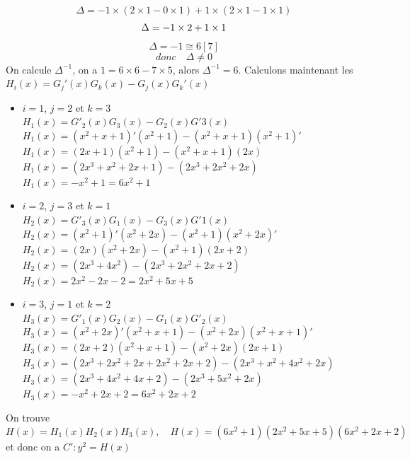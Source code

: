 \documentclass[12pt,a4paper]{article}
\begin{document}
	\[
		\Delta = -1 \times (2 \times 1 - 0 \times 1) + 1 \times (2 \times 1 - 1 \times 1)
	\]
	\[
		\Delta = -1 \times 2 + 1 \times 1\\
	\]
	\[
		\Delta = -1 \cong 6[7]
	\]
	\[
		donc \quad \Delta \neq 0
	\]
	On calcule $\Delta^{-1}$, on a $1 = 6 \times 6 - 7 \times 5$, alors $\Delta^{-1} = 6$. 
	Calculons maintenant les $H_i(x) = G_j'(x)G_k(x) - G_j(x)G_k'(x)$ \\
	\begin{itemize}
		\item $i = 1$, $j = 2$ et $k = 3$\\
			$H_1(x) = G'_2(x)G_3(x) - G_2(x)G'3(x)$\\
			$H_1(x) = (x^2 + x + 1)'(x^2 + 1) - (x^2 + x + 1)(x^2 + 1)'$\\
			$H_1(x) = (2x + 1)(x^2 + 1) - (x^2 + x + 1)(2x)$\\
			$H_1(x) = (2x^3 + x^2 + 2x + 1) - (2x^3 + 2x^2 + 2x)$\\
			$H_1(x) = -x^2 + 1 = 6 x^2 + 1$\\
		\item $i = 2$, $j = 3$ et $k = 1$\\
			$H_2(x) = G'_3(x)G_1(x) - G_3(x)G'1(x)$\\
			$H_2(x) = (x^2 + 1)'(x^2 + 2x) - (x^2 + 1)(x^2 + 2x)'$\\
			$H_2(x) = (2x)(x^2 + 2x) - (x^2 + 1)(2x + 2)$ \\
			$H_2(x) = (2x^3 + 4x^2) - (2x^3 + 2x^2 + 2x + 2)$ \\
			$H_2(x) = 2x^2 - 2x - 2 = 2x^2 + 5x + 5$\\
		\item $i = 3$, $j = 1$ et $k = 2$\\
			$H_3(x) = G'_1(x)G_2(x) - G_1(x)G'_2(x)$ \\
			$H_3(x) = (x^2 + 2x)'(x^2 + x + 1) - (x^2 + 2x)(x^2 + x + 1)'$ \\
			$H_3(x) = (2x + 2)(x^2 + x + 1) - (x^2 + 2x)(2x + 1)$ \\
			$H_3(x) = (2x^3 + 2x^2 + 2x + 2x^2 + 2x + 2) - (2x^3 + x^2 + 4x^2 + 2x)$ \\
			$H_3(x) = (2x^3 + 4x^2 + 4x + 2) - (2x^3 + 5x^2 + 2x)$ \\
			$H_3(x) = -x^2 + 2x + 2 = 6x^2 + 2x + 2$
			
	\end{itemize}
	On trouve 
	\[
		H(x) = H_1(x)H_2(x)H_3(x), \quad 
		H(x) =  (6 x^2 + 1)(2x^2 + 5x + 5)(6x^2 + 2x + 2)
	\]
	et donc on a $C': y^2 = H(x)$
\end{document}
